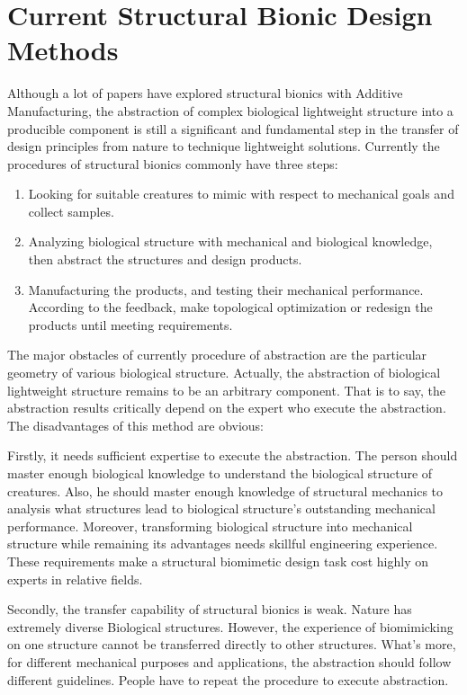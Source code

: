 \section{Current Structural Bionic Design Methods}
Although a lot of papers have explored structural bionics with Additive Manufacturing, the abstraction of complex biological lightweight structure into a producible component is still a significant and fundamental step in the transfer of design principles from nature to technique lightweight solutions. Currently the procedures of structural bionics commonly have three steps:
\begin{enumerate}
\item Looking for suitable creatures to mimic with respect to mechanical goals and collect samples.

\item Analyzing biological structure with mechanical and biological knowledge, then abstract the structures and design products.

\item Manufacturing the products, and testing their mechanical performance. According to the feedback, make topological optimization or redesign the products until meeting requirements.
\end{enumerate}

The major obstacles of currently procedure of abstraction are the particular geometry of various biological structure. Actually, the abstraction of biological lightweight structure remains to be an arbitrary component. That is to say, the abstraction results critically depend on the expert who execute the abstraction. The disadvantages of this method are obvious:

Firstly, it needs sufficient expertise to execute the abstraction. The person should master enough biological knowledge to understand the biological structure of creatures. Also, he should master enough knowledge of structural mechanics to analysis what structures lead to biological structure's outstanding mechanical performance. Moreover, transforming biological structure into mechanical structure while remaining its advantages needs skillful engineering experience. These requirements make a structural biomimetic design task cost highly on experts in relative fields.

Secondly, the transfer capability of structural bionics is weak. Nature has extremely diverse Biological structures. However, the experience of biomimicking on one structure cannot be transferred directly to other structures. What’s more, for different mechanical purposes and applications, the abstraction should follow different guidelines. People have to repeat the procedure to execute abstraction.

